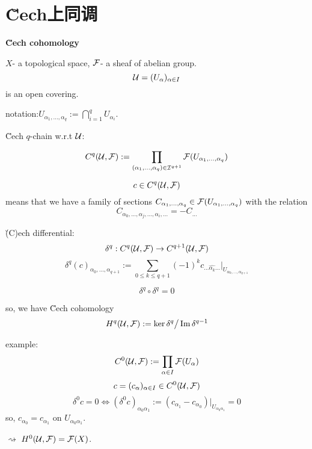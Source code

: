\section{\u{C}ech上同调}
\textbf{\u{C}ech cohomology}

$X$- a topological space, $\mathcal{F}$- a sheaf of abelian group.
$$\mathcal{U}=(U_{\alpha})_{\alpha\in I}$$
is an open covering.

notation:$U_{\alpha_1,...,\alpha_q}:=\bigcap_{i=1}^qU_{\alpha_i}$.

\u{C}ech $q$-chain w.r.t $\mathcal{U}$:

$$C^q(\mathcal{U},\mathcal{F}):=\prod_{(\alpha_1,...,\alpha_q)
\in\mathcal{I}^{q+1}}\mathcal{F}(U_{\alpha_1,...,\alpha_q})$$

$$c\in C^q(\mathcal{U},\mathcal{F})$$
means that we have a family of sections
$C_{\alpha_1,...,\alpha_q}\in\mathcal{F}(U_{\alpha_1,...,\alpha_q})$
with the relation
$$C_{\alpha_0,...,\alpha_j,...,\alpha_i,...}=-C_{...}$$

\u(C)ech differential:
$$\delta^q:C^q(\mathcal{U},\mathcal{F})\to C^{q+1}(\mathcal{U},\mathcal{F})$$
$$\delta^q(c)_{\alpha_0,...,\alpha_{q+1}}
:=\sum_{0\leq k\leq q+1}(-1)^k
c_{...\hat{\alpha_k}...}|_{U_{\alpha_0,...,\alpha_{q+1}}}$$

\begin{prop}
$$\delta^q\circ\delta^q=0$$
\end{prop}

so, we have \u{C}ech cohomology
$$H^q(\mathcal{U},\mathcal{F}):=\ker\delta^q\big/\operatorname{Im}\delta^{q-1}$$

example:
$$C^0(\mathcal{U},\mathcal{F}):=\prod_{\alpha\in I}\mathcal{F}(U_{\alpha})$$
$$c=(c_{\alpha})_{\alpha\in I}\in C^0(\mathcal{U},\mathcal{F})$$
$$\delta^0c=0\iff(\delta^0c)_{\alpha_0\alpha_1}
:=(c_{\alpha_1}-c_{\alpha_0})|_{U_{\alpha_0\alpha_1}}=0$$
so, $c_{\alpha_0}=c_{\alpha_1}$ on $U_{\alpha_0\alpha_1}$.

$\rightsquigarrow$ $H^0(\mathcal{U},\mathcal{F})=\mathcal{F}(X)$.

